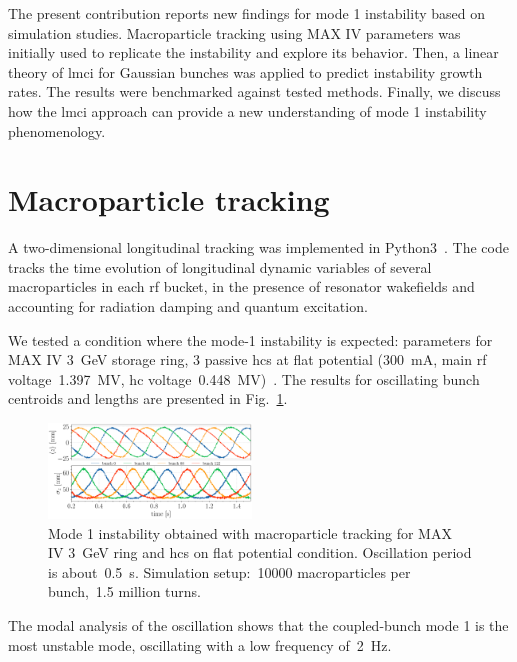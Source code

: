 \documentclass[a4paper,
               ]{jacow}
\begin{document}
The present contribution reports new findings for mode 1 instability based on simulation studies. Macroparticle tracking using MAX IV parameters was initially used to replicate the instability and explore its behavior. Then, a linear theory of \gls{lmci} for Gaussian bunches was applied to predict instability growth rates. The results were benchmarked against tested methods. Finally, we discuss how the \gls{lmci} approach can provide a new understanding of mode 1 instability phenomenology.

\section{Macroparticle tracking}
A two-dimensional longitudinal tracking was implemented in Python3~\cite{CollectiveEffectsRepo}. The code tracks the time evolution of longitudinal dynamic variables of several macroparticles in each rf bucket, in the presence of resonator wakefields and accounting for radiation damping and quantum excitation.

We tested a condition where the mode-1 instability is expected: parameters for MAX IV \SI{3}{\giga\electronvolt} storage ring, 3 passive \glspl{hc} at flat potential (\SI{300}{\milli\ampere}, main rf voltage~\SI{1.397}{\mega\volt}, \gls{hc} voltage~\SI{0.448}{\mega\volt})~\cite{Cullinan2024}. The results for oscillating bunch centroids and lengths are presented in Fig.~\ref{fig:1}.\begin{figure}[!ht]
    \centering
    \includegraphics[width=0.48\textwidth]{MOPS32_f1.pdf}
    \caption{Mode 1 instability obtained with macroparticle tracking for MAX IV \SI{3}{\giga\electronvolt} ring and \glspl{hc} on flat potential condition. Oscillation period is about~\SI{0.5}{\second}. Simulation setup:~\num{10000} macroparticles per bunch,~\num{1.5} million turns.}
    \label{fig:1}
\end{figure}

The modal analysis of the oscillation shows that the coupled-bunch mode 1 is the most unstable mode, oscillating with a low frequency of~\SI{2}{\hertz}.
\end{document}
